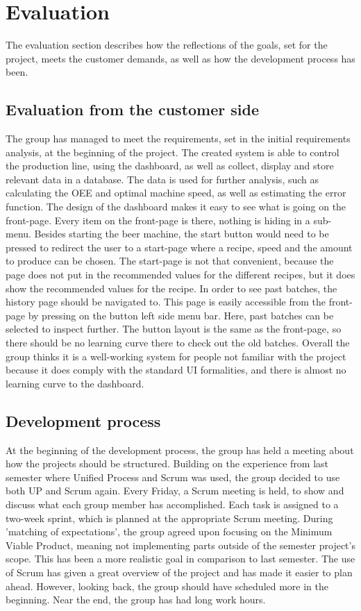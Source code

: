 \section{Evaluation}
The evaluation section describes how the reflections of the goals, set for the
project, meets the customer demands, as well as how the development process has
been.


\subsection{Evaluation from the customer side}
The group has managed to meet the requirements, set in the initial requirements
analysis, at the beginning of the project. The created system is able to control
the production line, using the dashboard, as well as collect, display and
store relevant data in a database. The data is used for further analysis, such
as calculating the OEE and optimal machine speed, as well as estimating the
error function.
The design of the dashboard makes it easy to see what is going on the front-page.
Every item on the front-page is there, nothing is hiding in a sub-menu.
Besides starting the beer machine, the start button would need to be pressed
to redirect the user to a start-page where a recipe, speed and the amount to
produce can be chosen. The start-page is not that convenient, because the page 
does not put in the recommended values for the different recipes, but it does
show the recommended values for the recipe.
In order to see past batches, the history page should be navigated to. This page
is easily accessible from the front-page by pressing on the button left
side menu bar. Here, past batches can be selected to inspect further. The button
layout is the same as the front-page, so there should be no learning curve there
to check out the old batches. Overall the group thinks it is a well-working
system for people not familiar with the project because it does comply with the
standard UI formalities, and there is almost no learning curve to the dashboard.


\subsection{Development process}
At the beginning of the development process, the group has held a meeting
about how the projects should be structured. Building on the experience from
last semester where Unified Process and Scrum was used, the group
decided to use both UP and Scrum again. Every Friday, a Scrum meeting is held,
to show and discuss what each group member has accomplished. Each task is
assigned to a two-week sprint, which is planned at the appropriate Scrum
meeting.
During 'matching of expectations', the group agreed upon focusing on the Minimum
Viable Product, meaning not implementing parts outside of the semester project's
scope. This has been a more realistic goal in comparison to last semester.
The use of Scrum has given a great overview of the project and has made it 
easier to plan ahead. However, looking back, the group should have scheduled 
more in the beginning. Near the end, the group has had long work hours.

